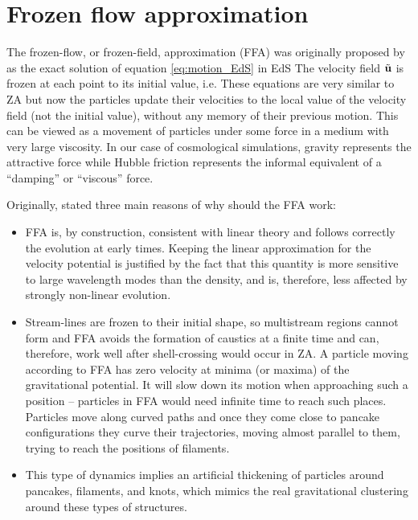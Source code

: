 \section{Frozen flow approximation}
The frozen-flow, or frozen-field, approximation (FFA) was originally proposed by \textcite{Matarrese:1992be} as the exact solution of equation \eqref{eq:motion_EdS} in EdS
The velocity field $\tilde{\mathbf u}$ is frozen at each point to its initial value, i.e.
These equations are very similar to ZA but now the particles update their velocities to the local value of the velocity field (not the initial value), without any memory of their previous motion. This can be viewed as a movement of particles under some force in a medium with very large viscosity. In our case of cosmological simulations, gravity represents the attractive force while Hubble friction represents the informal equivalent of a ``damping'' or ``viscous'' force.

Originally, \textcite{Matarrese:1992be} stated three main reasons of why should the FFA work:
\begin{itemize}
\item FFA is, by construction, consistent with linear theory and follows correctly the evolution at early times. Keeping the linear approximation for the velocity potential is justified by the fact that this quantity is more sensitive to large wavelength modes than the density, and is, therefore, less affected by strongly non-linear evolution.
\item Stream-lines are frozen to their initial shape, so multistream regions cannot form and FFA avoids the formation of caustics at a finite time and can, therefore, work well after shell-crossing would occur in ZA. A particle moving according to FFA has zero velocity at minima (or maxima) of the gravitational potential. It will slow down its motion when approaching such a position -- particles in FFA would need infinite time to reach such places. Particles move along curved paths and once they come close to pancake configurations they curve their trajectories, moving almost parallel to them, trying to reach the positions of filaments.
\item This type of dynamics implies an artificial thickening of particles around pancakes, filaments, and knots, which mimics the real gravitational clustering around these types of structures.
\end{itemize}

